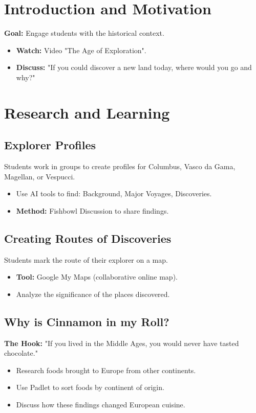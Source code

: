 \documentclass[11pt, a4paper]{article}
\begin{document}
\section{Introduction and Motivation}
\textbf{Goal:} Engage students with the historical context.
\begin{itemize}
    \item \textbf{Watch:} Video "The Age of Exploration".
    \item \textbf{Discuss:} "If you could discover a new land today, where would you go and why?"
\end{itemize}

\section{Research and Learning}
\subsection{Explorer Profiles}
Students work in groups to create profiles for Columbus, Vasco da Gama, Magellan, or Vespucci.
\begin{itemize}
    \item Use AI tools to find: Background, Major Voyages, Discoveries.
    \item \textbf{Method:} Fishbowl Discussion to share findings.
\end{itemize}

\subsection{Creating Routes of Discoveries}
Students mark the route of their explorer on a map.
\begin{itemize}
    \item \textbf{Tool:} Google My Maps (collaborative online map).
    \item Analyze the significance of the places discovered.
\end{itemize}

\subsection{Why is Cinnamon in my Roll?}
\textbf{The Hook:} "If you lived in the Middle Ages, you would never have tasted chocolate."
\begin{itemize}
    \item Research foods brought to Europe from other continents.
    \item Use Padlet to sort foods by continent of origin.
    \item Discuss how these findings changed European cuisine.
\end{itemize}
\end{document}
